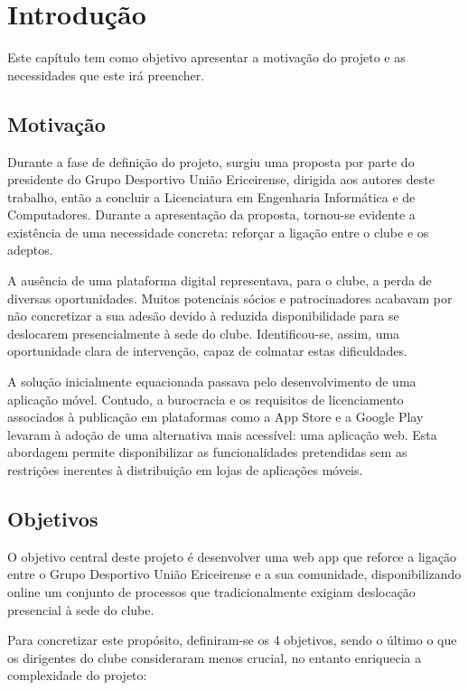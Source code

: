 %
%
\chapter{Introdução} \label{cap:intro}

Este capítulo tem como objetivo apresentar a motivação do projeto e as necessidades que este irá preencher.

%
%
\section{Motivação} \label{sec11}

Durante a fase de definição do projeto, surgiu uma proposta por parte do presidente do Grupo Desportivo União Ericeirense, dirigida aos autores deste trabalho, então a concluir a Licenciatura em Engenharia Informática e de Computadores. Durante a apresentação da proposta, tornou-se evidente a existência de uma necessidade concreta: reforçar a ligação entre o clube e os adeptos.

A ausência de uma plataforma digital representava, para o clube, a perda de diversas oportunidades. Muitos potenciais sócios e patrocinadores acabavam por não concretizar a sua adesão devido à reduzida disponibilidade para se deslocarem presencialmente à sede do clube. Identificou-se, assim, uma oportunidade clara de intervenção, capaz de colmatar estas dificuldades.

A solução inicialmente equacionada passava pelo desenvolvimento de uma aplicação móvel. Contudo, a burocracia e os requisitos de licenciamento associados à publicação em plataformas como a App Store e a Google Play levaram à adoção de uma alternativa mais acessível: uma aplicação web. Esta abordagem permite disponibilizar as funcionalidades pretendidas sem as restrições inerentes à distribuição em lojas de aplicações móveis.

%
%
\section{Objetivos} \label{sec12}

O objetivo central deste projeto é desenvolver uma web app que reforce a ligação entre o Grupo Desportivo União Ericeirense e a sua comunidade, disponibilizando online um conjunto de processos que tradicionalmente exigiam deslocação presencial à sede do clube.

Para concretizar este propósito, definiram-se os 4 objetivos, sendo o último o que os dirigentes do clube consideraram menos crucial, no entanto enriquecia a complexidade do projeto:

